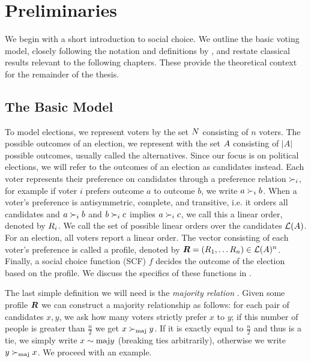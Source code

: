 \chapter{Preliminaries}
\label{chap: preliminaries}

We begin with a short introduction to social choice. We outline the basic
voting model, closely following the notation and definitions by
\citet{brandtHandbookComputationalSocial2016}, and restate classical results
relevant to the following chapters. These provide the theoretical context for
the remainder of the thesis.

\section{The Basic Model}

To model elections, we represent voters by the set $N$ consisting of $n$
voters. The possible outcomes of an election, we represent with the set
$A$ consisting of $|A|$ possible outcomes, usually called the
alternatives. Since our focus is on political elections, we will refer to the
outcomes of an election as candidates instead. Each voter represents their
preference on candidates through a preference relation $\succ_i$, for example
if voter $i$ prefers outcome $a$ to outcome $b$, we write $a \succ_{i} b$. When
a voter's preference is antisymmetric, complete, and transitive, i.e. it orders
all candidates and $a \succ_i b$ and $b \succ_i c$ implies $a \succ_i c$, we
call this a linear order, denoted by $R_i$. We call the set of
possible linear orders over the candidates $\mathcal{L}(A)$.  For an
election, all voters report a linear order. The vector consisting of each
voter's preference is called a profile, denoted by $\boldsymbol{R} =
	(R_1, \dots R_{n}) \in \mathcal{L}(A)^{n}$. Finally,
a social choice function (SCF) $f$ decides the outcome of the election based on
the profile. We discuss the specifics of these functions in .

The last simple definition we will need is the \emph{majority relation}
\cite{alma990028050780205131}. Given some profile $\boldsymbol{R}$ we can
construct a majority relationship as follows: for each pair of candidates
$x,y$, we ask how many voters strictly prefer $x$ to $y$; if this number of people is
greater than $\frac{n}{2}$ we get $x  \succ_{\textnormal{maj}} y$. If it is exactly equal to
$\frac{n}{2}$ and thus is a tie, we simply write $x \sim{\textnormal{maj}} y$ (breaking ties arbitrarily), otherwise we write $y \succ_{\textnormal{maj}} x$. We proceed with an
example.

